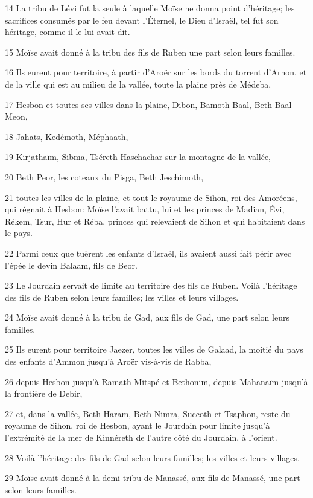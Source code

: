 \par 14 La tribu de Lévi fut la seule à laquelle Moïse ne donna point d'héritage; les sacrifices consumés par le feu devant l'Éternel, le Dieu d'Israël, tel fut son héritage, comme il le lui avait dit.
\par 15 Moïse avait donné à la tribu des fils de Ruben une part selon leurs familles.
\par 16 Ils eurent pour territoire, à partir d'Aroër sur les bords du torrent d'Arnon, et de la ville qui est au milieu de la vallée, toute la plaine près de Médeba,
\par 17 Hesbon et toutes ses villes dans la plaine, Dibon, Bamoth Baal, Beth Baal Meon,
\par 18 Jahats, Kedémoth, Méphaath,
\par 19 Kirjathaïm, Sibma, Tséreth Haschachar sur la montagne de la vallée,
\par 20 Beth Peor, les coteaux du Pisga, Beth Jeschimoth,
\par 21 toutes les villes de la plaine, et tout le royaume de Sihon, roi des Amoréens, qui régnait à Hesbon: Moïse l'avait battu, lui et les princes de Madian, Évi, Rékem, Tsur, Hur et Réba, princes qui relevaient de Sihon et qui habitaient dans le pays.
\par 22 Parmi ceux que tuèrent les enfants d'Israël, ils avaient aussi fait périr avec l'épée le devin Balaam, fils de Beor.
\par 23 Le Jourdain servait de limite au territoire des fils de Ruben. Voilà l'héritage des fils de Ruben selon leurs familles; les villes et leurs villages.
\par 24 Moïse avait donné à la tribu de Gad, aux fils de Gad, une part selon leurs familles.
\par 25 Ils eurent pour territoire Jaezer, toutes les villes de Galaad, la moitié du pays des enfants d'Ammon jusqu'à Aroër vis-à-vis de Rabba,
\par 26 depuis Hesbon jusqu'à Ramath Mitspé et Bethonim, depuis Mahanaïm jusqu'à la frontière de Debir,
\par 27 et, dans la vallée, Beth Haram, Beth Nimra, Succoth et Tsaphon, reste du royaume de Sihon, roi de Hesbon, ayant le Jourdain pour limite jusqu'à l'extrémité de la mer de Kinnéreth de l'autre côté du Jourdain, à l'orient.
\par 28 Voilà l'héritage des fils de Gad selon leurs familles; les villes et leurs villages.
\par 29 Moïse avait donné à la demi-tribu de Manassé, aux fils de Manassé, une part selon leurs familles.
